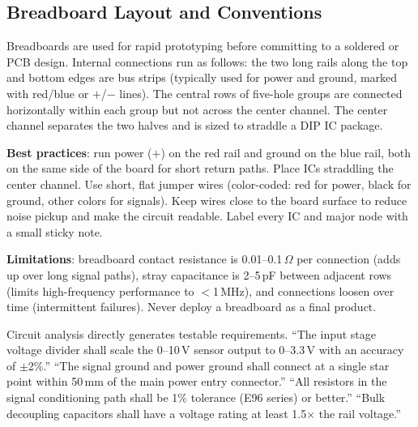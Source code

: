 \documentclass[11pt,letterpaper,twoside,openany]{book}
\begin{document}
\subsection{Breadboard Layout and Conventions}
Breadboards are used for rapid prototyping before committing to a soldered or PCB design. Internal connections run as follows: the two long rails along the top and bottom edges are bus strips (typically used for power and ground, marked with red/blue or $+$/$-$ lines). The central rows of five-hole groups are connected horizontally within each group but not across the center channel. The center channel separates the two halves and is sized to straddle a DIP IC package.

\textbf{Best practices}: run power ($+$) on the red rail and ground on the blue rail, both on the same side of the board for short return paths. Place ICs straddling the center channel. Use short, flat jumper wires (color-coded: red for power, black for ground, other colors for signals). Keep wires close to the board surface to reduce noise pickup and make the circuit readable. Label every IC and major node with a small sticky note.

\textbf{Limitations}: breadboard contact resistance is 0.01--0.1\,$\Omega$ per connection (adds up over long signal paths), stray capacitance is 2--5\,pF between adjacent rows (limits high-frequency performance to $<$1\,MHz), and connections loosen over time (intermittent failures). Never deploy a breadboard as a final product.

\begin{keyconceptbox}
Circuit analysis directly generates testable requirements. ``The input stage voltage divider shall scale the 0--10\,V sensor output to 0--3.3\,V with an accuracy of $\pm$2\%.'' ``The signal ground and power ground shall connect at a single star point within 50\,mm of the main power entry connector.'' ``All resistors in the signal conditioning path shall be 1\% tolerance (E96 series) or better.'' ``Bulk decoupling capacitors shall have a voltage rating at least 1.5$\times$ the rail voltage.''
\end{keyconceptbox}
\end{document}
